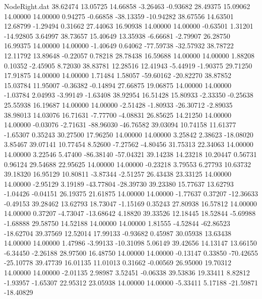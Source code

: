 \begin{filecontents}{NodeRight.dat}
  38.62474   13.05725   14.66858    -3.26463   -0.93682   28.49375   15.09062   14.00000   14.00000    0.94275   -0.66858  -38.13359  -10.94282
  38.67556   14.63501   12.68799    -1.29494    0.31662   27.44063   16.90938   14.00000   14.00000   -0.63501    1.31201  -14.92805    3.64997
  38.73657   15.40649   13.35938    -6.66681   -2.79907   26.28750   16.99375   14.00000   14.00000   -1.40649    0.64062  -77.59738  -32.57932
  38.78722   12.11792   13.89648    -0.22057    0.78218   28.78438   16.59688   14.00000   14.00000    1.88208    0.10352   -2.45905    8.72030
  38.83781   12.28516   12.41943    -5.44919   -1.90375   29.71250   17.91875   14.00000   14.00000    1.71484    1.58057  -59.60162  -20.82270
  38.87852   15.03784   11.95007    -0.36382   -0.14894   27.66875   19.06875   14.00000   14.00000   -1.03784    2.04993   -3.99149   -1.63408
  38.92954   16.51428   15.80933    -2.33350   -0.25638   25.55938   16.19687   14.00000   14.00000   -2.51428   -1.80933  -26.30712   -2.89035
  38.98013   14.03076   16.71631    -7.77700   -4.08831   26.85625   14.21250   14.00000   14.00000   -0.03076   -2.71631  -88.96030  -46.76582
  39.03094   10.74158   11.61377    -1.65307    0.35243   30.27500   17.96250   14.00000   14.00000    3.25842    2.38623  -18.08020    3.85467
  39.07141   10.77454    8.52600    -7.27562   -4.80456   31.75313   22.34063   14.00000   14.00000    3.22546    5.47400  -86.38140  -57.04321
  39.14238   14.23218   10.20447     0.56731    0.96124   29.54688   22.95625   14.00000   14.00000   -0.23218    3.79553    6.27793   10.63732
  39.18320   16.95129   10.80811    -3.87344   -2.51257   26.43438   23.33125   14.00000   14.00000   -2.95129    3.19189  -43.77804  -28.39730
  39.23380   15.77637   13.62793    -1.04426   -0.04151   26.19375   21.61875   14.00000   14.00000   -1.77637    0.37207  -12.36633   -0.49153
  39.28462   13.62793   18.73047    -1.15169    0.35243   27.80938   16.57812   14.00000   14.00000    0.37207   -4.73047  -13.68642    4.18820
  39.33526   12.18445   18.52844    -5.69988   -1.68888   29.58750   14.52188   14.00000   14.00000    1.81555   -4.52844  -62.86523  -18.62704
  39.37569   12.52014   17.99133    -0.93682    0.45987   30.05938   13.63438   14.00000   14.00000    1.47986   -3.99133  -10.31098    5.06149
  39.42656   14.13147   13.66150    -6.34450   -2.26188   28.97500   16.48750   14.00000   14.00000   -0.13147    0.33850  -70.42655  -25.10778
  39.47739   16.01135   11.01013     0.31662   -0.00569   26.95000   19.70312   14.00000   14.00000   -2.01135    2.98987    3.52451   -0.06338
  39.53836   19.33411    8.82812    -1.93957   -1.65307   22.95312   23.05938   14.00000   14.00000   -5.33411    5.17188  -21.59871  -18.40829

\end{filecontents}
